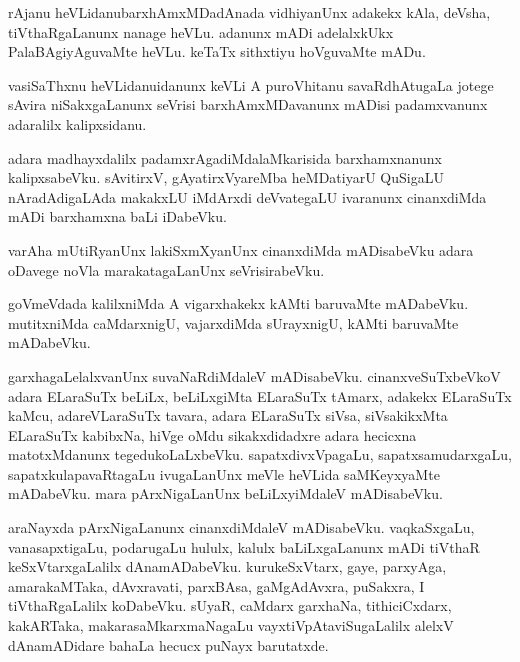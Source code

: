 \begin{mng}
rAjanu heVLidanu\mdash barxhAmxMDadAnada vidhiyanUnx adakekx kAla, deVsha, tiVthaRgaLanunx nanage heVLu. adanunx mADi adelalxkUkx PalaBAgiyAguvaMte heVLu. keTaTx sithxtiyu hoVguvaMte mADu.
\end{mng}

\begin{mng}
vasiSaThxnu heVLidanu\mdash idanunx keVLi A puroVhitanu savaRdhAtugaLa jotege sAvira niSakxgaLanunx seVrisi barxhAmxMDavanunx mADisi padamxvanunx adaralilx kalipxsidanu.
\end{mng}

\begin{mng}
adara madhayxdalilx padamxrAgadiMdalaMkarisida barxhamxnanunx kalipxsabeVku. sAvitirxV, gAyatirxVyareMba heMDatiyarU QuSigaLU nAradAdigaLAda makakxLU iMdArxdi deVvategaLU ivaranunx cinanxdiMda mADi barxhamxna baLi iDabeVku.
\end{mng}

\begin{mng}
varAha mUtiRyanUnx lakiSxmXyanUnx cinanxdiMda mADisabeVku adara oDavege noVla marakatagaLanUnx seVrisirabeVku.
\end{mng}

\begin{mng}
goVmeVdada kalilxniMda A vigarxhakekx kAMti baruvaMte mADabeVku. mutitxniMda caMdarxnigU, vajarxdiMda sUrayxnigU, kAMti baruvaMte mADabeVku.
\end{mng}

\begin{mng}
garxhagaLelalxvanUnx suvaNaRdiMdaleV mADisabeVku. cinanxveSuTxbeVkoV adara ELaraSuTx beLiLx, beLiLxgiMta ELaraSuTx tAmarx, adakekx ELaraSuTx kaMcu, adareVLaraSuTx tavara, adara ELaraSuTx siVsa, siVsakikxMta ELaraSuTx kabibxNa, hiVge oMdu sikakxdidadxre adara hecicxna matotxMdanunx tegedukoLaLxbeVku. sapatxdivxVpagaLu, sapatxsamudarxgaLu, sapatxkulapavaRtagaLu ivugaLanUnx meVle heVLida saMKeyxyaMte mADabeVku. mara pArxNigaLanUnx beLiLxyiMdaleV mADisabeVku.
\end{mng}

\begin{mng}
araNayxda pArxNigaLanunx cinanxdiMdaleV mADisabeVku. vaqkaSxgaLu, vanasapxtigaLu, podarugaLu hululx, kalulx baLiLxgaLanunx mADi tiVthaR keSxVtarxgaLalilx dAnamADabeVku. kurukeSxVtarx, gaye, parxyAga, amarakaMTaka, dAvxravati, parxBAsa, gaMgAdAvxra, puSakxra, I tiVthaRgaLalilx koDabeVku. sUyaR, caMdarx garxhaNa, tithiciCxdarx, kakARTaka, makarasaMkarxmaNagaLu vayxtiVpAtaviSugaLalilx alelxV dAnamADidare bahaLa hecucx puNayx barutatxde.
\end{mng}

